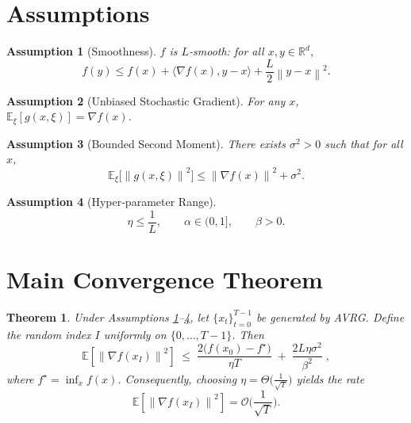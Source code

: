 \documentclass{article}
\newtheorem{theorem}{Theorem}
\newtheorem{assumption}{Assumption}
\newcommand{\E}{\mathbb{E}}
\newcommand{\norm}[1]{\left\lVert#1\right\rVert}
\begin{document}
\newpage
\section*{Assumptions}
\begin{assumption}[Smoothness]\label{ass:smooth}
$f$ is $L$‑smooth: for all $x,y\in\mathbb{R}^d$,
\[
f(y)\le f(x)+\langle\nabla f(x),y-x\rangle+\frac{L}{2}\norm{y-x}^2 .
\]
\end{assumption}
\begin{assumption}[Unbiased Stochastic Gradient]\label{ass:unbiased}
For any $x$, $\E_{\xi}[g(x,\xi)]=\nabla f(x)$.
\end{assumption}
\begin{assumption}[Bounded Second Moment]\label{ass:bounded}
There exists $\sigma^2>0$ such that for all $x$,
\[
\E_{\xi}\big[\norm{g(x,\xi)}^2\big]\le \norm{\nabla f(x)}^2+\sigma^2 .
\]
\end{assumption}
\begin{assumption}[Hyper‑parameter Range]\label{ass:hyper}
\[
\eta\le\frac{1}{L},\qquad \alpha\in(0,1],\qquad \beta>0 .
\]
\end{assumption}

\section*{Main Convergence Theorem}
\begin{theorem}\label{thm:main}
Under Assumptions \ref{ass:smooth}–\ref{ass:hyper}, let $\{x_t\}_{t=0}^{T-1}$ be generated by AVRG. Define the random index $I$ uniformly on $\{0,\dots,T-1\}$. Then
\[
\E\!\left[\norm{\nabla f(x_I)}^2\right]\;\le\;
\frac{2\big(f(x_0)-f^\star\big)}{\eta T}
\;+\;
\frac{2L\eta\sigma^2}{\beta^2}\;,
\tag{1}
\]
where $f^\star=\inf_x f(x)$. Consequently, choosing $\eta =\Theta\!\big(\frac{1}{\sqrt{T}}\big)$ yields the rate
\[
\E\!\left[\norm{\nabla f(x_I)}^2\right]=\mathcal{O}\!\Big(\frac{1}{\sqrt{T}}\Big).
\]
\end{theorem}
\end{document}
